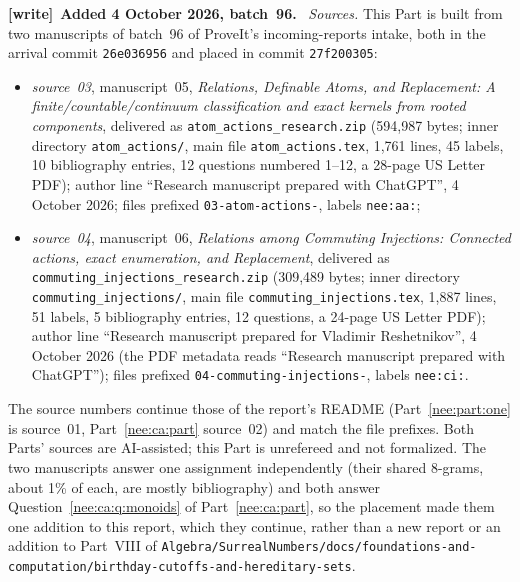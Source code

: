 \documentclass[11pt,letterpaper]{article}
\numberwithin{equation}{section}
\theoremstyle{plain}
\theoremstyle{definition}
\theoremstyle{remark}
\newenvironment{writenote}[1][]{\par\smallskip\begingroup\small\raggedright
 \setlength{\parindent}{1.25em}\noindent\textbf{[write]}\if\relax\detokenize{#1}\relax\else~\textbf{#1.}\fi\ }%
 {\par\endgroup\smallskip}
\begin{document}
\begin{writenote}[Added 4 October 2026, batch~96]
\emph{Sources.} This Part is built from two manuscripts of batch~96 of ProveIt's incoming-reports intake, both in the arrival commit \texttt{26e036956} and placed in commit \texttt{27f200305}:
\begin{itemize}
\item \emph{source~03}, manuscript~05, \emph{Relations, Definable Atoms, and Replacement: A finite/countable/continuum classification and exact kernels from rooted components}, delivered as \texttt{atom\_\allowbreak actions\_\allowbreak research.zip} (594,987 bytes; inner directory \texttt{atom\_\allowbreak actions/}, main file \texttt{atom\_\allowbreak actions.tex}, 1,761 lines, 45 labels, 10 bibliography entries, 12 questions numbered 1--12, a 28-page US Letter PDF); author line ``Research manuscript prepared with ChatGPT'', 4 October 2026; files prefixed \texttt{03-atom-actions-}, labels \texttt{nee:aa:};
\item \emph{source~04}, manuscript~06, \emph{Relations among Commuting Injections: Connected actions, exact enumeration, and Replacement}, delivered as \texttt{commuting\_\allowbreak injections\_\allowbreak research.zip} (309,489 bytes; inner directory \texttt{commuting\_\allowbreak injections/}, main file \texttt{commuting\_\allowbreak injections.tex}, 1,887 lines, 51 labels, 5 bibliography entries, 12 questions, a 24-page US Letter PDF); author line ``Research manuscript prepared for Vladimir Reshetnikov'', 4 October 2026 (the PDF metadata reads ``Research manuscript prepared with ChatGPT''); files prefixed \texttt{04-commuting-injections-}, labels \texttt{nee:ci:}.
\end{itemize}
The source numbers continue those of the report's README (Part~\ref{nee:part:one} is source~01, Part~\ref{nee:ca:part} source~02) and match the file prefixes. Both Parts' sources are AI-assisted; this Part is unrefereed and not formalized. The two manuscripts answer one assignment independently (their shared 8-grams, about 1\% of each, are mostly bibliography) and both answer Question~\ref{nee:ca:q:monoids} of Part~\ref{nee:ca:part}, so the placement made them one addition to this report, which they continue, rather than a new report or an addition to Part~VIII of \nolinkurl{Algebra/SurrealNumbers/docs/foundations-and-computation/birthday-cutoffs-and-hereditary-sets}.


\end{writenote}
\end{document}
